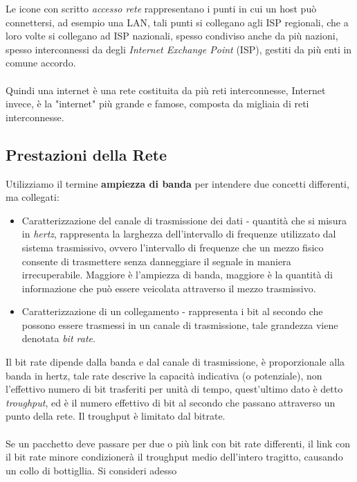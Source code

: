 \documentclass[12pt, letterpaper]{article}
\newcommand{\acc}{\\\hphantom{}\\}
\begin{document}
Le icone con scritto \textit{accesso rete} rappresentano i punti in cui un host può connettersi, ad esempio una LAN, tali punti si
collegano agli ISP regionali, che a loro volte si collegano ad ISP nazionali, spesso condiviso anche da più nazioni, spesso
interconnessi da degli \textit{Internet Exchange Point} (ISP), gestiti da più enti in comune accordo.\acc Quindi una
internet è una rete costituita da più reti interconnesse, Internet invece, è la "internet" più grande e famose, composta da migliaia di reti
interconnesse.
\subsection{Prestazioni della Rete}
Utilizziamo il termine \textbf{ampiezza di banda} per intendere due concetti differenti, ma collegati: \begin{itemize}
    \item Caratterizzazione del canale di trasmissione dei dati - quantità che si misura in \textit{hertz},
          rappresenta la larghezza dell'intervallo di frequenze utilizzato dal sistema trasmissivo,
          ovvero l'intervallo di frequenze che un mezzo fisico consente di trasmettere senza
          danneggiare il segnale in maniera irrecuperabile. Maggiore è l'ampiezza di banda,
          maggiore è la quantità di informazione che può essere veicolata attraverso il mezzo
          trasmissivo.
    \item Caratterizzazione di un collegamento - rappresenta i bit al secondo che possono essere trasmessi
          in un canale di trasmissione, tale grandezza viene denotata \textit{bit rate}.
\end{itemize}
Il bit rate dipende dalla banda e dal canale di trasmissione, è proporzionale alla banda in hertz, tale rate descrive
la capacità indicativa (o potenziale), non l'effettivo numero di bit trasferiti per unità di tempo, quest'ultimo
dato è detto \textit{troughput}, ed è il numero effettivo di bit al secondo che passano attraverso un
punto della rete. Il troughput è limitato dal bitrate.\acc
Se un pacchetto deve passare per due o più link con bit rate differenti, il link con il bit rate minore
condizionerà il troughput medio dell'intero tragitto, causando un collo di bottigllia. Si consideri adesso
\end{document}
